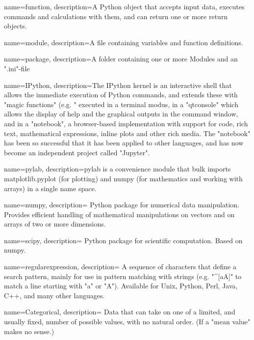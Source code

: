 \makeglossaries

{
    name=function,
    description={A Python object that accepts input data, executes commands and
    calculations with them, and can return one or more return objects.}
}

{
    name=module,
    description={A file containing variables and function definitions.}
}

{
    name=package,
    description={A folder containing one or more Modules and an ".ini"-file}
}

{
    name=IPython,
    description={The IPython kernel is an interactive shell that allows the immediate
    execution of Python commands, and extends these with "magic functions"
    (e.g. "%
    executed in a terminal modus, in a "qtconsole" which allows the display of
    help and the graphical outputs in the command window, and in a "notebook",
    a browser-based implementation with support for code, rich text,
    mathematical expressions, inline plots and other rich media. The
    "notebook" has been so successful that it has been applied to other
    languages, and has now become an independent project called "Jupyter".}
}

{
    name=pylab,
    description={pylab is a convenience module that bulk imports matplotlib.pyplot (for
    plotting) and numpy (for mathematics and working with arrays) in a single
    name space.}
}

{
    name=numpy,
    description={ Python package for numerical data manipulation. Provides efficient
    handling of mathematical manipulations on vectors and on arrays of two or
    more dimensions.}
}

{
    name=scipy,
    description={ Python package for scientific computation. Based on numpy.}
}

{
    name=regularexpression,
    description={ A sequence of characters that define a search pattern, mainly for use in
    pattern matching with strings (e.g. "^[aA]" to match a line starting with
    "a" or "A"). Available for Unix, Python, Perl, Java, C++, and many other
    languages. }
}

{
    name=Categorical,
    description={ Data that can take on one of a limited, and usually fixed, number of
    possible values, with no natural order. (If a "mean value" makes no
    sense.)}
}

